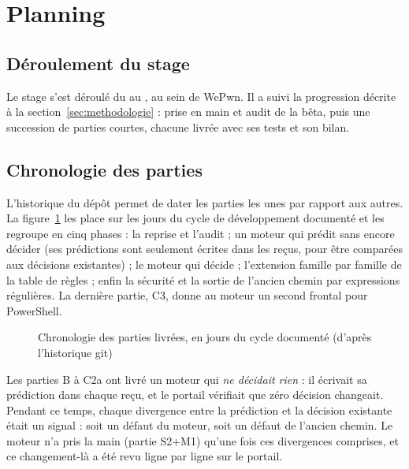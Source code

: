 \section{Planning}
\label{sec:planning}

\subsection{Déroulement du stage}
Le stage s'est déroulé du \datedebut{} au \datefin{}, au sein de WePwn. Il a suivi la
progression décrite à la section~\ref{sec:methodologie} : prise en main et audit de la
bêta, puis une succession de parties courtes, chacune livrée avec ses tests et son bilan.

\subsection{Chronologie des parties}
L'historique du dépôt permet de dater les parties les unes par rapport aux autres. La
figure~\ref{fig:gantt} les place sur les jours du cycle de développement documenté et
les regroupe en cinq phases : la reprise et l'audit ; un moteur qui prédit sans encore
décider (ses prédictions sont seulement écrites dans les reçus, pour être comparées aux
décisions existantes) ; le moteur qui décide ; l'extension famille par famille de la table
de règles ; enfin la sécurité et la sortie de l'ancien chemin par expressions régulières.
La dernière partie, C3, donne au moteur un second frontal pour PowerShell.

\begin{figure}[htbp]
\centering

\caption{Chronologie des parties livrées, en jours du cycle documenté (d'après l'historique git)}
\label{fig:gantt}
\end{figure}

\begin{pourquoi}
Les parties B à C2a ont livré un moteur qui \emph{ne décidait rien} : il écrivait sa
prédiction dans chaque reçu, et le portail vérifiait que zéro décision changeait. Pendant
ce temps, chaque divergence entre la prédiction et la décision existante était un
signal : soit un défaut du moteur, soit un défaut de l'ancien chemin. Le moteur n'a pris
la main (partie S2+M1) qu'une fois ces divergences comprises, et ce changement-là a été
revu ligne par ligne sur le portail.
\end{pourquoi}
